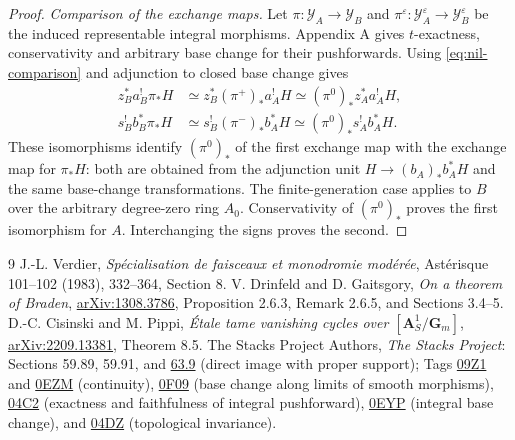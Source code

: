 \documentclass[11pt,a4paper]{article}
\newcommand{\A}{\mathbf A}
\newcommand{\Gm}{\mathbf G_m}
\newcommand{\cY}{\mathscr Y}
\theoremstyle{notes}
\begin{document}
\begin{proof}
\emph{Comparison of the exchange maps.}
Let $\pi:\cY_A\to\cY_B$ and $\pi^\varepsilon:\cY_A^\varepsilon\to\cY_B^\varepsilon$ be the induced representable integral morphisms. Appendix A gives $t$-exactness, conservativity and arbitrary base change for their pushforwards. Using \eqref{eq:nil-comparison} and adjunction to closed base change gives
\begin{equation}\label{eq:transport}
\begin{aligned}
z_B^*a_B^!\pi_*H
&\simeq z_B^*(\pi^+)_*a_A^!H
\simeq(\pi^0)_*z_A^*a_A^!H,\\
s_B^!b_B^*\pi_*H
&\simeq s_B^!(\pi^-)_*b_A^*H
\simeq(\pi^0)_*s_A^!b_A^*H.
\end{aligned}
\end{equation}
These isomorphisms identify $(\pi^0)_*$ of the first exchange map with the exchange map for $\pi_*H$: both are obtained from the adjunction unit $H\to(b_A)_*b_A^*H$ and the same base-change transformations. The finite-generation case applies to $B$ over the arbitrary degree-zero ring $A_0$. Conservativity of $(\pi^0)_*$ proves the first isomorphism for $A$. Interchanging the signs proves the second.
\end{proof}

\begin{thebibliography}{9}
\small\setlength{\itemsep}{2pt}
J.-L. Verdier, \emph{Spécialisation de faisceaux et monodromie modérée}, Astérisque 101--102 (1983), 332--364, Section 8.
V. Drinfeld and D. Gaitsgory, \emph{On a theorem of Braden}, \href{https://arxiv.org/abs/1308.3786}{arXiv:1308.3786}, Proposition 2.6.3, Remark 2.6.5, and Sections 3.4--5.
D.-C. Cisinski and M. Pippi, \emph{Étale tame vanishing cycles over $[\A^1_S/\Gm]$}, \href{https://arxiv.org/abs/2209.13381}{arXiv:2209.13381}, Theorem 8.5.
The Stacks Project Authors, \emph{The Stacks Project}: Sections 59.89, 59.91, and \href{https://stacks.math.columbia.edu/tag/0F7H}{63.9} (direct image with proper support); Tags \href{https://stacks.math.columbia.edu/tag/09Z1}{09Z1} and \href{https://stacks.math.columbia.edu/tag/0EZM}{0EZM} (continuity), \href{https://stacks.math.columbia.edu/tag/0F09}{0F09} (base change along limits of smooth morphisms), \href{https://stacks.math.columbia.edu/tag/04C2}{04C2} (exactness and faithfulness of integral pushforward), \href{https://stacks.math.columbia.edu/tag/0EYP}{0EYP} (integral base change), and \href{https://stacks.math.columbia.edu/tag/04DZ}{04DZ} (topological invariance).
\end{thebibliography}
\end{document}
